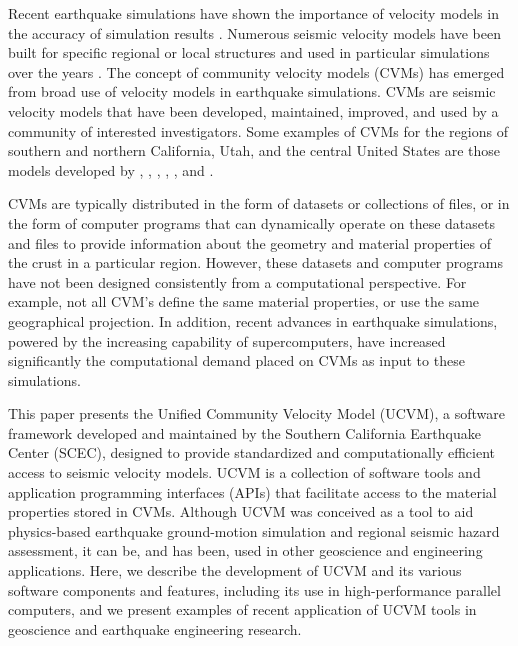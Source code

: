 Recent earthquake simulations have shown the importance of velocity models in the accuracy of simulation results \citep[e.g.,][]{Taborda_2014_BSSA}. Numerous seismic velocity models have been built for specific regional or local structures and used in particular simulations over the years \citep[e.g.,][]{Frankel_1992_BSSA, Brocher_2008_BSSA, Graves_2008_BSSA}. The concept of community velocity models (CVMs) has emerged from broad use of velocity models in earthquake simulations. CVMs are seismic velocity models that have been developed, maintained, improved, and used by a community of interested investigators. Some examples of CVMs for the regions of southern and northern California, Utah, and the central United States are those models developed by \citet{Kohler_2003_BSSA}, \citet{Suss_2003_JGR}, \citet{Brocher_2006_Proc}, \citet{Magistrale_2006_Tech}, \citet{Plesch_2011_SCEC}, and \citet{RamirezGuzman_2012_BSSA}. 

CVMs are typically distributed in the form of datasets or collections of files, or in the form of computer programs that can dynamically operate on these datasets and files to provide information about the geometry and material properties of the crust in a particular region. However, these datasets and computer programs have not been designed consistently from a computational perspective. For example, not all CVM's define the same material properties, or use the same geographical projection. In addition, recent advances in earthquake simulations, powered by the increasing capability of supercomputers, have increased significantly the computational demand placed on CVMs as input to these simulations.

This paper presents the Unified Community Velocity Model (UCVM), a software framework developed and maintained by the Southern California Earthquake Center (SCEC), designed to provide standardized and computationally efficient access to seismic velocity models. UCVM is a collection of software tools and application programming interfaces (APIs) that facilitate access to the material properties stored in CVMs. Although UCVM was conceived as a tool to aid physics-based earthquake ground-motion simulation and regional seismic hazard assessment, it can be, and has been, used in other geoscience and engineering applications. Here, we describe the development of UCVM and its various software components and features, including its use in high-performance parallel computers, and we present examples of recent application of UCVM tools in geoscience and earthquake engineering research.

